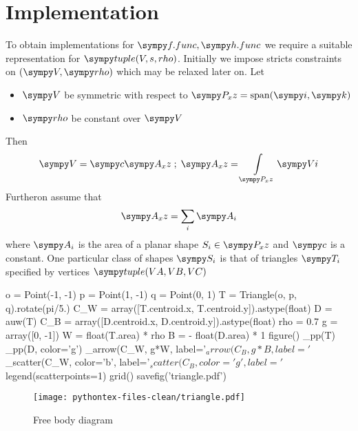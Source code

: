 \section{Implementation}
To obtain implementations for $\s{f.func}, \s{h.func}$ we require a suitable representation for $\s{tuple(V, s, rho)}$.
Initially we impose stricts constraints on $(\s{V}, \s{rho})$ which may be relaxed later on.
Let 
\begin{itemize}
	\item $\s{V}$ be symmetric with respect to $\s{P_xz} = \operatorname{span}(\s{i}, \s{k})$
	\item $\s{rho}$ be constant over $\s{V}$
\end{itemize}
Then 
$$\s{V} = \s{c} \s{A_xz} \;;\; \s{A_xz} = \int\limits_{\s{P_xz}} \s{Vi}$$
Furtheron assume that 
$$\s{A_xz} = \sum\limits_i\s{A_i}$$
where $\s{A_i}$ is the area of a planar shape $S_i \in \s{P_xz}$ and $\s{c}$ is a constant.  
One particular class of shapes $\s{S_i}$ is that of triangles $\s{T_i}$ specified by vertices $\s{tuple(VA, VB, VC)}$


\begin{pylabcode}
o = Point(-1, -1)
p = Point(1, -1)
q = Point(0, 1)
T = Triangle(o, p, q).rotate(pi/5.)
C_W = array([T.centroid.x, T.centroid.y]).astype(float)
D = auw(T)
C_B = array([D.centroid.x, D.centroid.y]).astype(float)
rho = 0.7
g = array([0, -1])
W =  float(T.area) * rho
B =  - float(D.area) * 1 
figure()
_pp(T)
_pp(D, color='g')
_arrow(C_W, g*W, label='$%
_arrow(C_B, g*B, label='$%
_scatter(C_W, color='b', label='$%
_scatter(C_B, color='g', label='$%
legend(scatterpoints=1)
grid()
savefig('triangle.pdf')
\end{pylabcode}

\begin{figure}[]
	\centering
	\texttt{[image: pythontex-files-clean/triangle.pdf]}
	\caption{Free body diagram}
	\label{fig:fbd}
\end{figure}


